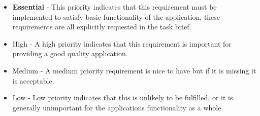 \documentclass[11pt]{article}
\begin{document}
\begin{itemize}
    \item \textbf{Essential} - This priority indicates that this requirement must be implemented to satisfy basic functionality of the application, these requirements are all explicitly requested in the task brief.
    \item High - A high priority indicates that this requirement is important for providing a good quality application.
    \item Medium - A medium priority requirement is nice to have but if it is missing it is acceptable.
    \item Low - Low priority indicates that this is unlikely to be fulfilled, or it is generally unimportant for the applications functionality as a whole.
\end{itemize}
\end{document}
